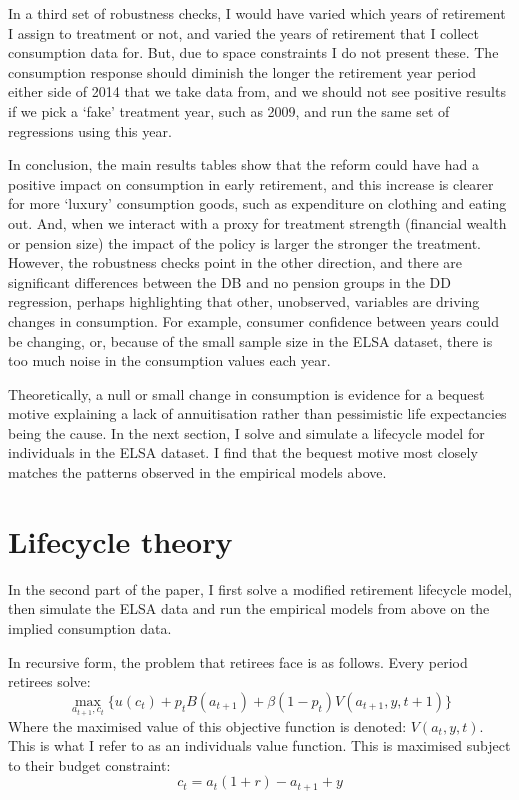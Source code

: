 \documentclass[12pt]{article}
\begin{document}
In a third set of robustness checks, I would have varied which years of
retirement I assign to treatment or not, and varied the years of retirement that
I collect consumption data for. But, due to space constraints I do not present
these. The consumption response should diminish the longer the retirement year
period either side of 2014 that we take data from, and we should not see
positive results if we pick a `fake' treatment year, such as 2009, and run the
same set of regressions using this year.

In conclusion, the main results tables show that the reform could have had a
positive impact on consumption in early retirement, and this increase is clearer
for more `luxury' consumption goods, such as expenditure on clothing and eating
out. And, when we interact with a proxy for treatment strength (financial wealth
or pension size) the impact of the policy is larger the stronger the treatment.
However, the robustness checks point in the other direction, and there are
significant differences between the DB and no pension groups in the DD
regression, perhaps highlighting that other, unobserved, variables are driving
changes in consumption. For example, consumer confidence between years could be
changing, or, because of the small sample size in the ELSA dataset, there is too
much noise in the consumption values each year.

Theoretically, a null or small change in consumption is evidence for a
bequest motive explaining a lack of annuitisation rather than pessimistic life
expectancies being the cause. In the next section, I solve and simulate a
lifecycle model for individuals in the ELSA dataset. I find that the bequest
motive most closely matches the patterns observed in the empirical models above.

\section{Lifecycle theory}

In the second part of the paper, I first solve a modified retirement lifecycle
model, then simulate the ELSA data and run the empirical models from
above on the implied consumption data.

In recursive form, the problem that retirees face is as follows. Every period
retirees solve:
\begin{equation*}
    \underset{a_{t+1}, c_{t}}{\max} \{ u(c_{t}) + p_{t}B(a_{t+1}) + \beta(1-p_{t})V(a_{t+1}, y, t+1) \}
\end{equation*}
Where the maximised value of this objective function is denoted: $V(a_{t}, y,
    t)$. This is what I refer to as an individuals value function.
This is maximised subject to their budget constraint:
\begin{equation*}
    c_{t} =a_{t}(1 +r) -  a_{t+1} + y
\end{equation*}
\end{document}
